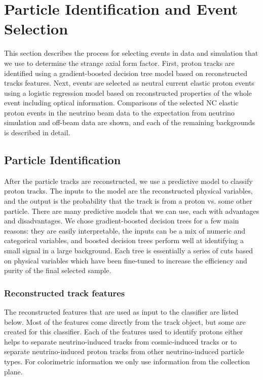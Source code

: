\section{Particle Identification and Event Selection}\label{protonid}
\hspace{\parindent}
This section describes the process for selecting events in data and simulation
that we use to determine the strange axial form factor. First, proton tracks
are identified using a gradient-boosted decision tree model based on
reconstructed tracks features. Next, events are selected as neutral current
elastic proton events using a logistic regression model based on reconstructed
properties of the whole event including optical information. Comparisons of the
selected NC elastic proton events in the neutrino beam data to the expectation
from neutrino simulation and off-beam data are shown, and each of the remaining
backgrounds is described in detail.

\subsection{Particle Identification}
  After the particle tracks are reconstructed, we use a predictive model to
  classify proton tracks. The inputs to the model are the reconstructed
  physical variables, and the output is the probability that the track is from
  a proton vs. some other particle. There are many predictive models that we
  can use, each with advantages and disadvantages. We chose gradient-boosted
  decision trees for a few main reasons: they are easily interpretable, the
  inputs can be a mix of numeric and categorical variables, and boosted
  decision trees perform well at identifying a small signal in a large
  background.  Each tree is essentially a series of cuts based on physical
  variables which have been fine-tuned to increase the efficiency and purity of
  the final selected sample.
  \subsubsection{Reconstructed track features}\label{sec:features}
    The reconstructed features that are used as input to the classifier are
    listed below. Most of the features come directly from the track object, but
    some are created for this classifier. Each of the features used to identify
    protons either helps to separate neutrino-induced tracks from
    cosmic-induced tracks or to separate neutrino-induced proton tracks from
    other neutrino-induced particle types. For colorimetric information we only
    use information from the collection plane.

